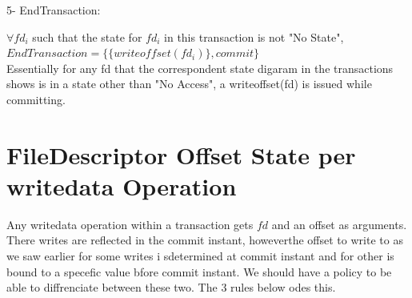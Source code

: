 \documentclass[a4paper, 11pt]{article}
\begin{document}


5- EndTransaction: 

\hspace{8mm} $\forall fd_i$ such that the state for $fd_i$ in this transaction is  not "No State",  $EndTransaction= \{\{{writeoffset(fd_i)}\}, commit\}$\\

Essentially for any fd that the correspondent state digaram in the transactions shows is in a state other than "No Access", a writeoffset(fd) is issued while committing.\\



\section{FileDescriptor Offset State per writedata Operation}

Any writedata operation within a transaction gets $fd$ and an offset as arguments. There writes are reflected in the commit instant, howeverthe offset to write to as we saw earlier for some writes i sdetermined at commit instant and for other is bound to a specefic value bfore commit instant. We should have a policy to be able to diffrenciate between these two. The 3 rules below odes this.\\
\end{document}
